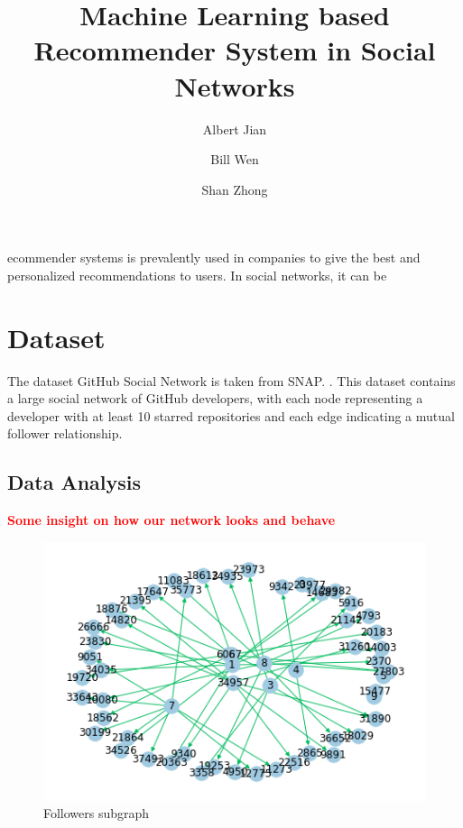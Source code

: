 \documentclass[9pt,twoside]{pnas-new}
\title{Machine Learning based Recommender System in Social Networks}
\author[a]{Albert Jian}
\author[a]{Bill Wen}
\author[a]{Shan Zhong}
\affil[a]{University of California, Los Angeles}
\newcommand\boldred[1]{\textcolor{red}{\textbf{#1}}}
\begin{document}
\maketitle
\thispagestyle{firststyle}

ecommender systems is prevalently used in companies to give the best and personalized recommendations to users. In social networks, it can be 

\section*{Dataset}
The dataset GitHub Social Network is taken from SNAP. \cite{rozemberczki2019multiscale}. This dataset contains a large social network of GitHub developers, with each node representing a developer with at least 10 starred repositories and each edge indicating a mutual follower relationship.
\subsection*{Data Analysis}
\boldred{Some insight on how our network looks and behave}

\begin{figure}%
    \centering
    \includegraphics[width=.8\linewidth]{Figures/subgraph.png}
    \caption{Followers subgraph}
    \label{fig:followers_subgraph}
\end{figure}
\end{document}
